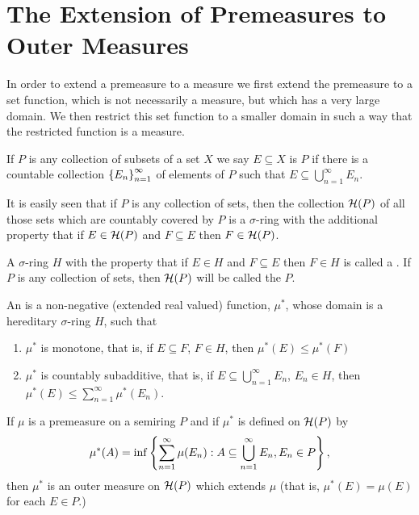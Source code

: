 \section{The Extension of Premeasures to Outer Measures}

In order to extend a premeasure to a measure we first extend the premeasure to a set function, which is not necessarily a measure, but which has a very large domain. We then restrict this set function to a smaller domain in such a way that the restricted function is a measure.

\begin{definition}
If $P$ is any collection of subsets of a set $X$ we say $E\subseteq X$ is  $P$ if there is a countable collection $\left\{E_n\right\}_{n=1}^\infty$ of elements of $P$ such that $E\subseteq\bigcup_{n=1}^\infty E_n$.
\end{definition}

It is easily seen that if $P$ is any collection of sets, then the collection ${\cal H}(P)$ of all those sets which are countably covered by $P$ is a $\sigma$-ring with the additional property that if $E\in{\cal H}(P)$ and $F\subseteq E$ then $F\in{\cal H}(P)$.

\begin{definition}
A $\sigma$-ring $H$ with the property that if $E\in H$ and $F\subseteq E$ then $F\in H$ is called a .
If $P$ is any collection of sets, then ${\cal H}(P)$ will be called the  $P$.
\end{definition}

\begin{definition}
An  is a non-negative (extended real valued) function, $\mu^*$, whose domain is a hereditary $\sigma$-ring $H$, such that
\begin{enumerate}[label=\arabic*)]
    \item\label{def:outer measure 1}
    $\mu^*$ is monotone, that is, if $E\subseteq F$, $F\in H$, then $\mu^*(E)\leq\mu^*(F)$
    \item\label{def:outer measure 2}
    $\mu^*$ is countably subadditive, that is, if $E\subseteq\bigcup_{n=1}^\infty E_n$, $E_n\in H$, then $\mu^*(E)\leq\sum_{n=1}^\infty\mu^*(E_n)$.
\end{enumerate}
\end{definition}

\begin{theorem}\label{thm:outer measure of premeasure}
If $\mu$ is a premeasure on a semiring $P$ and if $\mu^*$ is defined on ${\cal H}(P)$ by $$\mu^*(A)=\inf \left\{\sum_{n=1}^\infty\mu(E_n): A\subseteq\bigcup_{n=1}^\infty E_n, E_n \in P\right\},$$ then $\mu^*$ is an outer measure on ${\cal H}(P)$ which extends $\mu$ (that is, $\mu^*(E)=\mu(E)$ for each $E\in P$.)
\end{theorem}

